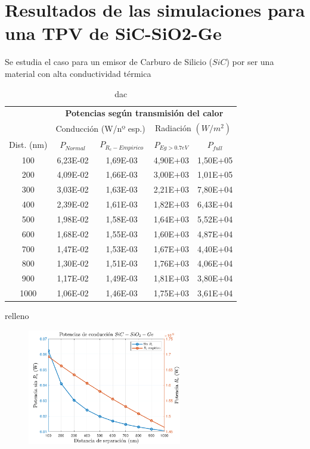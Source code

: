 \section{Resultados de las simulaciones para una TPV de SiC-SiO2-Ge}
Se estudia el caso para un emisor de Carburo de Silicio ($SiC$) por ser una material con alta conductividad térmica \cite{doi:Near_field_ThinFilm}
\begin{table}[h]
	\centering
		\begin{tabular}{|c||c|c||c|c|}
		\hline
\multirow{2}{*}{ }& \multicolumn{4}{c|}{\textbf{\large Potencias según transmisión del calor}}\\ \cline{2-5}
& \multicolumn{2}{c||}{Conducción (W/nº esp.)}& \multicolumn{2}{c|}{Radiación $(W/m^2)$}\\ \hline
Dist. (nm)&$P_{Normal}$&$P_{R_c-Empirico}$&$P_{Eg>0.7eV}$&$P_{full}$\\ \hline \hline
100&6,23E-02&1,69E-03&4,90E+03&1,50E+05\\ \hline 
200&4,09E-02&1,66E-03&3,00E+03&1,01E+05\\ \hline 
300&3,03E-02&1,63E-03&2,21E+03&7,80E+04\\ \hline 
400&2,39E-02&1,61E-03&1,82E+03&6,43E+04\\ \hline 
500&1,98E-02&1,58E-03&1,64E+03&5,52E+04\\ \hline 
600&1,68E-02&1,55E-03&1,60E+03&4,87E+04\\ \hline 
700&1,47E-02&1,53E-03&1,67E+03&4,40E+04\\ \hline 
800&1,30E-02&1,51E-03&1,76E+03&4,06E+04\\ \hline 
900&1,17E-02&1,49E-03&1,81E+03&3,80E+04\\ \hline 
1000&1,06E-02&1,46E-03&1,75E+03&3,61E+04\\ \hline 
		\end{tabular}
	\caption{dac}
	\label{tab:dac}
\end{table}

relleno
\begin{figure}[H]
	\centering
		\includegraphics[width=0.6\textwidth]{figuras/Resultados/conduccion/pdf/Prc_SiCSiO2Ge.pdf}
	\caption{ }
	\label{fig:Prc_SiCSiO2Ge}
\end{figure}

